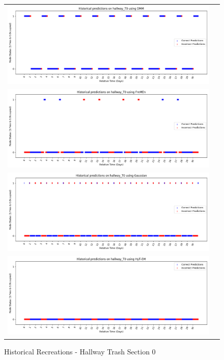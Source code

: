 \begin{figure}[!Hp]
  \begin{tabular}{cc}
    {\includegraphics[width = 6in]{images/results/Historical_hallway_T0_DMM.png}} \\
    {\includegraphics[width = 6in]{images/results/Historical_hallway_T0_FreMEn.png}} \\
    {\includegraphics[width = 6in]{images/results/Historical_hallway_T0_Gaussian.png}} \\
    {\includegraphics[width = 6in]{images/results/Historical_hallway_T0_HyT-EM.png}} \\
  \end{tabular}
  \caption{Historical Recreations - Hallway Trash Section 0}
\end{figure}

